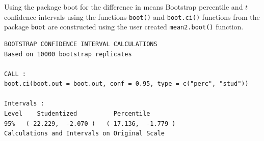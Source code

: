 \documentclass[
  ignorenonframetext,
]{beamer}
\newenvironment{Shaded}{\begin{snugshade}}{\end{snugshade}}
\newcommand{\AttributeTok}[1]{\textcolor[rgb]{0.13,0.29,0.53}{#1}}
\newcommand{\ControlFlowTok}[1]{\textcolor[rgb]{0.13,0.29,0.53}{\textbf{#1}}}
\newcommand{\DecValTok}[1]{\textcolor[rgb]{0.00,0.00,0.81}{#1}}
\newcommand{\FloatTok}[1]{\textcolor[rgb]{0.00,0.00,0.81}{#1}}
\newcommand{\FunctionTok}[1]{\textcolor[rgb]{0.13,0.29,0.53}{\textbf{#1}}}
\newcommand{\NormalTok}[1]{#1}
\newcommand{\OtherTok}[1]{\textcolor[rgb]{0.56,0.35,0.01}{#1}}
\newcommand{\SpecialCharTok}[1]{\textcolor[rgb]{0.81,0.36,0.00}{\textbf{#1}}}
\newcommand{\StringTok}[1]{\textcolor[rgb]{0.31,0.60,0.02}{#1}}
\begin{document}
\begin{frame}[fragile]{Using the package boot for the difference in
means}
\label{using-the-package-boot-for-the-difference-in-means}
Bootstrap percentile and \(t\) confidence intervals using the functions
\texttt{boot()} and \texttt{boot.ci()} functions from the package
\texttt{boot} are constructed using the user created
\texttt{mean2.boot()} function.

\tiny

\begin{Shaded}
\end{Shaded}

\begin{verbatim}
BOOTSTRAP CONFIDENCE INTERVAL CALCULATIONS
Based on 10000 bootstrap replicates

CALL : 
boot.ci(boot.out = boot.out, conf = 0.95, type = c("perc", "stud"))

Intervals : 
Level    Studentized          Percentile     
95%   (-22.229,  -2.070 )   (-17.136,  -1.779 )  
Calculations and Intervals on Original Scale
\end{verbatim}

\normalsize
\end{frame}
\end{document}
